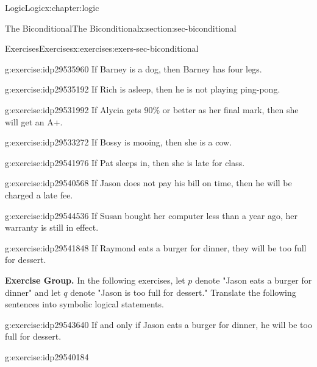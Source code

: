 \documentclass[twoside,10pt,]{book}
\numberwithin{equation}{section}
\begin{document}
\begin{chapterptx}{Logic}{}{Logic}{}{}{x:chapter:logic}
\begin{sectionptx}{The Biconditional}{}{The Biconditional}{}{}{x:section:sec-biconditional}
\begin{exercises-subsection}{Exercises}{}{Exercises}{}{}{x:exercises:exers-sec-biconditional}
\begin{exercisegroup}
\begin{divisionexerciseeg}{19}{}{}{g:exercise:idp29535960}%
If Barney is a dog, then Barney has four legs.\end{divisionexerciseeg}%
\begin{divisionexerciseeg}{20}{}{}{g:exercise:idp29535192}%
If Rich is asleep, then he is not playing ping-pong.\end{divisionexerciseeg}%
\begin{divisionexerciseeg}{21}{}{}{g:exercise:idp29531992}%
If Alycia gets 90\% or better as her final mark, then she will get an A+.\end{divisionexerciseeg}%
\begin{divisionexerciseeg}{22}{}{}{g:exercise:idp29533272}%
If Bossy is mooing, then she is a cow.\end{divisionexerciseeg}%
\begin{divisionexerciseeg}{23}{}{}{g:exercise:idp29541976}%
If Pat sleeps in, then she is late for class.\end{divisionexerciseeg}%
\begin{divisionexerciseeg}{24}{}{}{g:exercise:idp29540568}%
If Jason does not pay his bill on time, then he will be charged a late fee.\end{divisionexerciseeg}%
\begin{divisionexerciseeg}{25}{}{}{g:exercise:idp29544536}%
If Susan bought her computer less than a year ago, her warranty is still in effect.\end{divisionexerciseeg}%
\begin{divisionexerciseeg}{26}{}{}{g:exercise:idp29541848}%
If Raymond eats a burger for dinner, they will be too full for dessert.\end{divisionexerciseeg}%
\end{exercisegroup}
\par\medskip\noindent
\par\medskip\noindent%
\textbf{Exercise Group.}\space\space%
In the following exercises, let \(p\) denote "Jason eats a burger for dinner" and let \(q\) denote "Jason is too full for dessert."  Translate the following sentences into symbolic logical statements.\begin{exercisegroup}
\begin{divisionexerciseeg}{27}{}{}{g:exercise:idp29543640}%
If and only if Jason eats a burger for dinner, he will be too full for dessert.\end{divisionexerciseeg}%
\begin{divisionexerciseeg}{28}{}{}{g:exercise:idp29540184}%

\end{divisionexerciseeg}
\end{exercisegroup}
\end{exercises-subsection}
\end{sectionptx}
\end{chapterptx}
\end{document}
